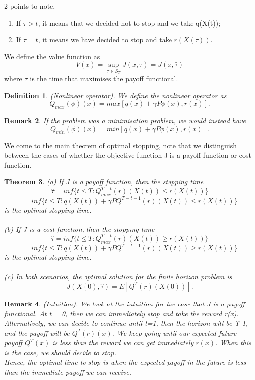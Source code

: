 \documentclass[twoside]{article}
\newcounter{lecnum}
\newtheorem{theorem}{Theorem}[lecnum]
\newtheorem{remark}[theorem]{Remark}
\newtheorem{definition}[theorem]{Definition}
\begin{document}
2 points to note, 
\begin{enumerate}
\item If $\tau > t$, it means that we decided not to stop and we take q(X(t));
\item If $\tau = t$, it means we have decided to stop and take $r(X(\tau))$.
\end{enumerate}

We define the value function as 
$$
V(x) = \sup_{\tau \in S_T}J(x,\tau) = J(x,\hat{\tau})
$$
where $\tau$ is the time that maximises the payoff functional. 

\begin{definition}(Nonlinear operator). We define the nonlinear operator as
$$
Q_{max}(\phi)(x) = max[q(x) + \gamma P\phi(x), r(x)].
$$
\end{definition}

\begin{remark}If the problem was a minimisation problem, we would instead have 
$$
Q_{min}(\phi)(x) = min[q(x) + \gamma P\phi(x), r(x)].
$$
\end{remark}

We come to the main theorem of optimal stopping, note that we distinguish between the cases of whether the objective function J is a payoff function or cost function.
\begin{theorem}
(a) If J is a payoff function, then the stopping time 
$$
\hat{\tau} = inf\{t \leq T: Q_{max}^{T-t}(r)(X(t)) \leq r(X(t))\}
$$
$$
= inf\{t \leq T: q(X(t)) + \gamma PQ^{T-t-1}(r)(X(t)) \leq r(X(t))\}
$$
is the optimal stopping time. \\\\
(b) If J is a cost function, then the stopping time 
$$
\hat{\tau} = inf\{t \leq T: Q_{max}^{T-t}(r)(X(t)) \geq r(X(t))\}
$$
$$
= inf\{t \leq T: q(X(t)) + \gamma PQ^{T-t-1}(r)(X(t)) \geq r(X(t))\}
$$
is the optimal stopping time. \\\\
(c) In both scenarios, the optimal solution for the finite horizon problem is 
$$
J(X(0),\hat{\tau}) = E[Q^T(r)(X(0))].
$$
\end{theorem}
\begin{remark}(Intuition). We look at the intuition for the case that J is a payoff functional. At t = 0, then we can immediately stop and take the reward r(x). Alternatively, we can decide to continue until t=1, then the horizon will be T-1, and the payoff will be $Q^T(r)(x)$. We keep going until our expected future payoff $Q^T(x)$ is less than the reward we can get immediately $r(x)$. When this is the case, we should decide to stop.\\ Hence, the optimal time to stop is when the expected payoff in the future is less than the immediate payoff we can receive.
\end{remark}
\end{document}
